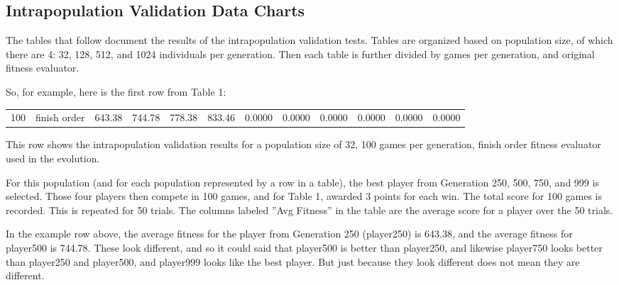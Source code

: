 \clearpage
\begin{landscape}
\thispagestyle{empty}
\setcounter{secnumdepth}{1}
\chapter{Intrapopulation Validation Data Charts}
\label{appendix:intravalidation}

The tables that follow document the results of the intrapopulation validation
tests. Tables are organized based on population size, of which there are 4: 32,
128, 512, and 1024 individuals per generation. Then each table is further
divided by games per generation, and original fitness evaluator.

So, for example, here is the first row from Table 1:

\begin{table}[ht]
  \centering
    \begin{tabularx}{\linewidth}{|p{1in}|p{1in}|r|r|r|r|r|r|r|r|r|r|}
 \cline{1-12}
      \multirow{1}{*}{100} & finish order & 643.38 & 744.78 & 778.38 & 833.46 & 0.0000 & 0.0000 & 0.0000 & 0.0000 & 0.0000 & 0.0000 \\
 \cline{1-12}
    \end{tabularx}%
\end{table}%

This row shows the intrapopulation validation results for a population size of
32, 100 games per generation, finish order fitness evaluator used in the
evolution.

For this population (and for each population represented by a row in a table),
the best player from Generation 250, 500, 750, and 999 is selected. Those four
players then compete in 100 games, and for Table 1, awarded 3 points for each 
win. The total score for 100 games is recorded. This is repeated for 50 trials.
The columns labeled ''Avg Fitness'' in the table are the average score for a
player over the 50 trials.

In the example row above, the average fitness for the player from Generation 250
(player250) is 643.38, and the average fitness for player500 is 744.78. These
look different, and so it could said that player500 is better than player250, and
likewise player750 looks better than player250 and player500, and player999
looks like the best player. But just because they look different does not mean
they are different.


\end{landscape}

